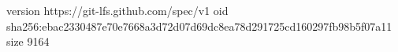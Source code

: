 version https://git-lfs.github.com/spec/v1
oid sha256:ebac2330487e70e7668a3d72d07d69dc8ea78d291725cd160297fb98b5f07a11
size 9164

